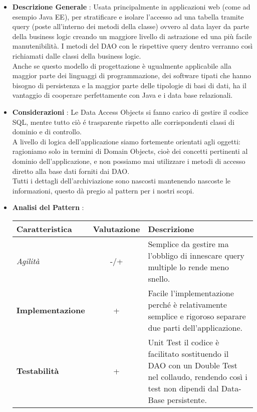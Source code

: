 {{{			\begin{itemize}\itemsep1pt
				\item \textbf{Descrizione Generale} : Usata principalmente in applicazioni web (come ad esempio Java EE), per stratificare e isolare l'accesso ad una tabella tramite query (poste all'interno dei metodi della classe) ovvero al data layer da parte della business logic creando un maggiore livello di astrazione ed una più facile manutenibilità. I metodi del DAO con le rispettive query dentro verranno così richiamati dalle classi della business logic.\\ 
				Anche se questo modello di progettazione è ugualmente applicabile alla maggior parte dei linguaggi di programmazione, dei software tipati che hanno bisogno di persistenza e la maggior parte delle tipologie di basi di dati, ha il vantaggio di cooperare perfettamente con Java e i data base relazionali.
				\item \textbf{Considerazioni} : Le Data Access Objects si fanno carico di gestire il codice SQL, mentre tutto ciò é trasparente rispetto alle corrispondenti classi di dominio e di controllo.\\ 
				A livello di logica dell'applicazione siamo fortemente orientati agli oggetti: ragioniamo solo in termini di Domain Objects, cioè dei concetti pertinenti al dominio dell'applicazione, e non possiamo mai utilizzare i metodi di accesso diretto alla base dati forniti dai DAO. \\
				Tutti i dettagli dell'archiviazione sono nascosti mantenendo nascoste le informazioni, questo dà pregio al pattern per i nostri scopi.
				\item \textbf{Analisi del Pattern} :
				\small %
				{\renewcommand\arraystretch{1.2} %
					\begin{tabular}{|l|c|l|}
						\hline
						{\textbf{Caratteristica}}&{\textbf{Valutazione}}&{\textbf{Descrizione}}\\
						\hline
						\textit{Agilità} & -/+ & Semplice da gestire ma l'obbligo di innescare query multiple lo rende meno snello. \\
						\hline
						\textbf{Implementazione} & + & Facile l'implementazione perché è relativamente semplice e rigoroso separare due parti dell'applicazione. \\
						\hline
						\textbf{Testabilità} & + & Unit Test il codice è facilitato sostituendo il DAO con un Double Test nel collaudo, rendendo così i test non dipendi dal Data-Base persistente. \\

\end{tabular}}
\end{itemize}}}}
